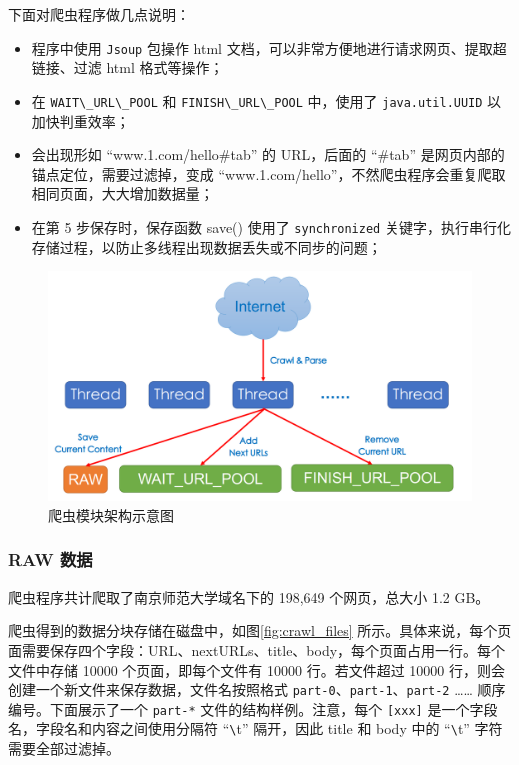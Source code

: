 \documentclass{ctexart}
\newcommand{\code}[1]{\colorbox{backcolor}{\lstinline|#1|}}
\begin{document}
    下面对爬虫程序做几点说明：

    \begin{itemize}
        \item 程序中使用 \code{Jsoup} 包操作 html 文档，可以非常方便地进行请求网页、提取超链接、过滤 html 格式等操作；
        \item 在 \code{WAIT\_URL\_POOL} 和 \code{FINISH\_URL\_POOL} 中，使用了 \code{java.util.UUID} 以加快判重效率；
        \item 会出现形如 “www.1.com/hello#tab” 的 URL，后面的 “#tab” 是网页内部的锚点定位，需要过滤掉，变成 “www.1.com/hello”，不然爬虫程序会重复爬取相同页面，大大增加数据量；
        \item 在第 5 步保存时，保存函数 save() 使用了 \code{synchronized} 关键字，执行串行化存储过程，以防止多线程出现数据丢失或不同步的问题；
    \end{itemize}

    \begin{figure}[t]
        \centering
        \includegraphics[width=\textwidth]{src/crawl}
        \caption{爬虫模块架构示意图}
        \label{fig:crawl}
    \end{figure}

    \subsubsection{RAW 数据}\label{subsubsec:crawl_data}

    爬虫程序共计爬取了南京师范大学域名下的 198,649 个网页，总大小 1.2 GB。

    爬虫得到的数据分块存储在磁盘中，如图\ref{fig:crawl_files} 所示。具体来说，每个页面需要保存四个字段：URL、nextURLs、title、body，每个页面占用一行。每个文件中存储 10000 个页面，即每个文件有 10000 行。若文件超过 10000 行，则会创建一个新文件来保存数据，文件名按照格式 \code{part-0}、\code{part-1}、\code{part-2} …… 顺序编号。下面展示了一个 \code{part-*} 文件的结构样例。注意，每个 \code{[xxx]} 是一个字段名，字段名和内容之间使用分隔符 “\verb|\|t” 隔开，因此 title 和 body 中的 “\verb|\|t” 字符需要全部过滤掉。
\end{document}
